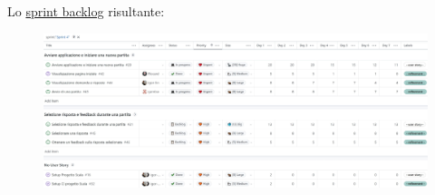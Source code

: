 
Lo \href{https://github.com/orgs/ISIQuiz/projects/3/}{sprint backlog} risultante:

\begin{figure}[H]
    \centering
    \includegraphics[width=\textwidth]{process/Img/Sprint4BL.jpg}
    \label{fig:Sprint4BL}
\end{figure}